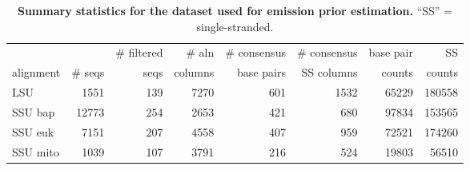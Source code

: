 \begin{table}
\begin{center}
\begin{tabular}{lrrrrrrr} 
& & \# filtered & \# aln & \# consensus & \# consensus & base pair & SS \\
alignment & \# seqs & seqs & columns & base pairs  & SS columns & counts & counts \\ \hline
LSU      & 1551  & 139  & 7270 & 601 & 1532  & 65229 & 180558  \\
SSU bap  & 12773 & 254  & 2653 & 421 & 680   & 97834 & 153565  \\
SSU euk  & 7151  & 207  & 4558 & 407 & 959   & 72521 & 174260  \\
SSU mito & 1039  & 107  & 3791 & 216 & 524   & 19803 & 56510   \\ 
\end{tabular}
\end{center}
\caption{\textbf{Summary statistics for the dataset used for emission prior
    estimation.} ``SS'' = single-stranded.} 
\label{tbl:emissioncounts}
\end{table}
